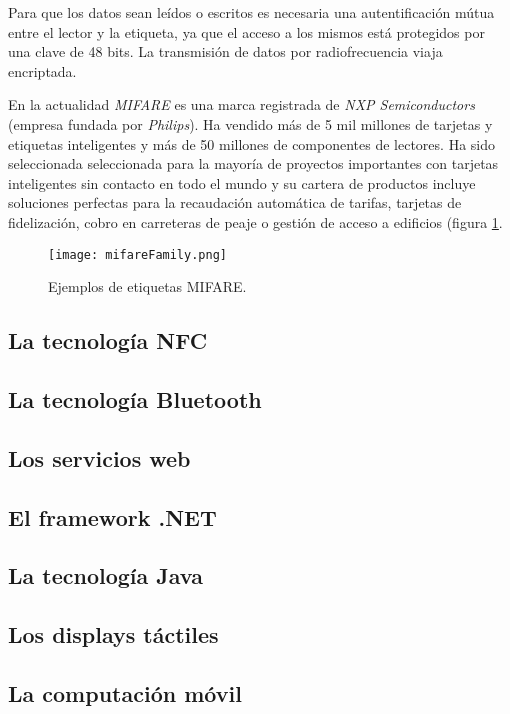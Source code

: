   Para que los datos sean leídos o escritos es necesaria una autentificación 
  mútua entre el lector y la etiqueta, ya que el acceso a los mismos está 
  protegidos por una clave de 48 bits. La transmisión de datos por
  radiofrecuencia viaja encriptada.

  En la actualidad \emph{MIFARE} es una marca registrada de \emph{NXP
  Semiconductors} (empresa fundada por \emph{Philips}). Ha vendido más de 5 mil
  millones de tarjetas y etiquetas inteligentes y más de 50 millones de
  componentes de lectores. Ha sido seleccionada seleccionada para la mayoría
  de proyectos importantes con tarjetas inteligentes sin contacto en todo el
  mundo y su cartera de productos incluye soluciones perfectas para la
  recaudación automática de tarifas, tarjetas de fidelización, cobro en 
  carreteras de peaje o gestión de acceso a edificios\cite{bib:urlMifare} 
  (figura \ref{fig:mifareFamily}.

  \begin{figure}[!h]
    \begin{center}
      \texttt{[image: mifareFamily.png]}
      \caption{Ejemplos de etiquetas MIFARE.}
      \label{fig:mifareFamily}
    \end{center}
  \end{figure}

  \subsection{La tecnología NFC}
  \subsection{La tecnología Bluetooth}
  \subsection{Los servicios web}
  \subsection{El framework .NET}
  \subsection{La tecnología Java}
  \subsection{Los displays táctiles}
  \subsection{La computación móvil}


